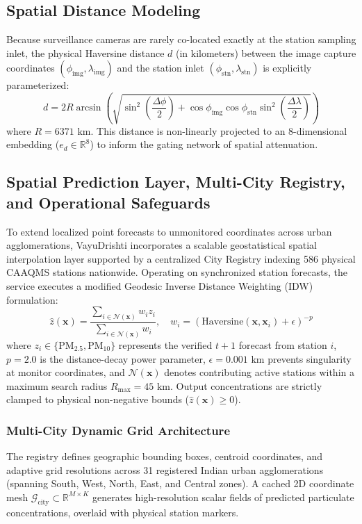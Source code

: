 \documentclass[conference]{IEEEtran}
\begin{document}
\subsection{Spatial Distance Modeling}
Because surveillance cameras are rarely co-located exactly at the station sampling inlet, the physical Haversine distance $d$ (in kilometers) between the image capture coordinates $(\phi_{\text{img}}, \lambda_{\text{img}})$ and the station inlet $(\phi_{\text{stn}}, \lambda_{\text{stn}})$ is explicitly parameterized:
\begin{equation}
d = 2R \arcsin\left(\sqrt{\sin^2\left(\frac{\Delta\phi}{2}\right) + \cos\phi_{\text{img}}\cos\phi_{\text{stn}}\sin^2\left(\frac{\Delta\lambda}{2}\right)}\right)
\end{equation}
where $R = 6371\text{ km}$. This distance is non-linearly projected to an 8-dimensional embedding ($e_d \in \mathbb{R}^8$) to inform the gating network of spatial attenuation.

\subsection{Spatial Prediction Layer, Multi-City Registry, and Operational Safeguards}
To extend localized point forecasts to unmonitored coordinates across urban agglomerations, VayuDrishti incorporates a scalable geostatistical spatial interpolation layer supported by a centralized City Registry indexing 586 physical CAAQMS stations nationwide. Operating on synchronized station forecasts, the service executes a modified Geodesic Inverse Distance Weighting (IDW) formulation:
\begin{equation}
\hat{z}(\mathbf{x}) = \frac{\sum_{i \in \mathcal{N}(\mathbf{x})} w_i z_i}{\sum_{i \in \mathcal{N}(\mathbf{x})} w_i}, \quad w_i = \left(\text{Haversine}(\mathbf{x}, \mathbf{x}_i) + \epsilon\right)^{-p}
\end{equation}
where $z_i \in \{\text{PM}_{2.5}, \text{PM}_{10}\}$ represents the verified $t+1$ forecast from station $i$, $p = 2.0$ is the distance-decay power parameter, $\epsilon = 0.001\text{ km}$ prevents singularity at monitor coordinates, and $\mathcal{N}(\mathbf{x})$ denotes contributing active stations within a maximum search radius $R_{\text{max}} = 45\text{ km}$. Output concentrations are strictly clamped to physical non-negative bounds ($\hat{z}(\mathbf{x}) \ge 0$).

\subsubsection{Multi-City Dynamic Grid Architecture}
The registry defines geographic bounding boxes, centroid coordinates, and adaptive grid resolutions across 31 registered Indian urban agglomerations (spanning South, West, North, East, and Central zones). A cached 2D coordinate mesh $\mathcal{G}_{\text{city}} \subset \mathbb{R}^{M \times K}$ generates high-resolution scalar fields of predicted particulate concentrations, overlaid with physical station markers.
\end{document}
